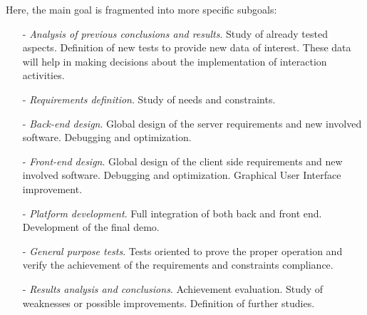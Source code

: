 \documentclass{acm_proc_article-sp}
\begin{document}
Here, the main goal is fragmented into more specific subgoals:

\begin{itemize}
  \item[-] \textit{Analysis of previous conclusions and results}. Study of already tested aspects. Definition of new tests to provide new data of interest. These data will help in making decisions about the implementation of interaction activities. 
  \item[-] \textit{Requirements definition}. Study of needs and constraints.
  \item[-] \textit{Back-end design}. Global design of the server requirements and new involved software. Debugging and optimization. 
  \item[-] \textit{Front-end design}. Global design of the client side requirements and new involved software. Debugging and optimization. Graphical User Interface improvement. 
  \item[-] \textit{Platform development}. Full integration of both back and front end. Development of the final demo. 
  \item[-] \textit{General purpose tests}. Tests oriented to prove the proper operation and verify
the achievement of the requirements and constraints compliance.
  \item[-] \textit{Results analysis and conclusions}. Achievement evaluation. Study of weaknesses or possible improvements. Definition of further studies.
\end{itemize}
\end{document}
